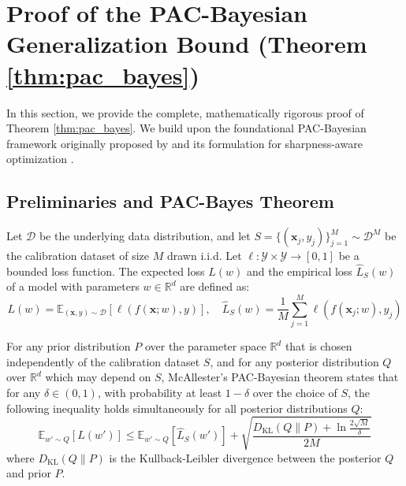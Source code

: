 \documentclass{article}
\theoremstyle{plain}
\theoremstyle{definition}
\theoremstyle{remark}
\begin{document}
\newpage
\appendix
\onecolumn
\section{Proof of the PAC-Bayesian Generalization Bound (Theorem \ref{thm:pac_bayes})}
\label{sec:proof}

In this section, we provide the complete, mathematically rigorous proof of Theorem \ref{thm:pac_bayes}. We build upon the foundational PAC-Bayesian framework originally proposed by \cite{mcallester1999some} and its formulation for sharpness-aware optimization \cite{sam}.

\subsection{Preliminaries and PAC-Bayes Theorem}
Let $\mathcal{D}$ be the underlying data distribution, and let $S = \{(\mathbf{x}_j, y_j)\}_{j=1}^M \sim \mathcal{D}^M$ be the calibration dataset of size $M$ drawn i.i.d. Let $\ell: \mathcal{Y} \times \mathcal{Y} \to [0, 1]$ be a bounded loss function. The expected loss $L(w)$ and the empirical loss $\widehat{L}_S(w)$ of a model with parameters $w \in \mathbb{R}^d$ are defined as:
\begin{equation}
    L(w) = \mathbb{E}_{(\mathbf{x}, y) \sim \mathcal{D}} [\ell(f(\mathbf{x}; w), y)], \quad \widehat{L}_S(w) = \frac{1}{M} \sum_{j=1}^M \ell(f(\mathbf{x}_j; w), y_j)
\end{equation}

For any prior distribution $P$ over the parameter space $\mathbb{R}^d$ that is chosen independently of the calibration dataset $S$, and for any posterior distribution $Q$ over $\mathbb{R}^d$ which may depend on $S$, McAllester's PAC-Bayesian theorem \cite{mcallester1999some, mcallester2003pac} states that for any $\delta \in (0, 1)$, with probability at least $1 - \delta$ over the choice of $S$, the following inequality holds simultaneously for all posterior distributions $Q$:
\begin{equation}
\label{eq:mcallester}
    \mathbb{E}_{w' \sim Q} [L(w')] \le \mathbb{E}_{w' \sim Q} [\widehat{L}_S(w')] + \sqrt{\frac{D_{\text{KL}}(Q \parallel P) + \ln \frac{2\sqrt{M}}{\delta}}{2M}}
\end{equation}
where $D_{\text{KL}}(Q \parallel P)$ is the Kullback-Leibler divergence between the posterior $Q$ and prior $P$.
\end{document}
